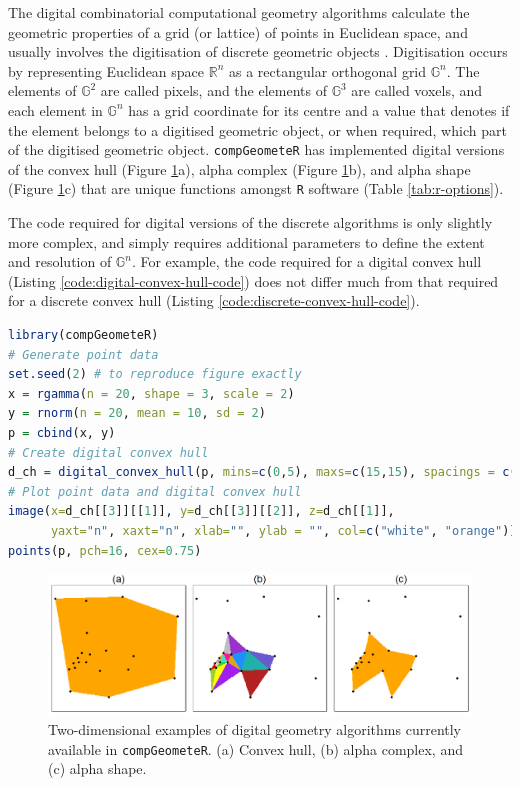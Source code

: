 \documentclass[12pt, a4paper]{article}
\begin{document}
The digital combinatorial computational geometry algorithms calculate the geometric properties of a grid (or lattice) of points in Euclidean space, and usually involves the digitisation of discrete geometric objects \citep{rosenfeld-1989}.  Digitisation occurs by representing Euclidean space $\mathbb{R}^n$ as a rectangular orthogonal grid $\mathbb{G}^n$.  The elements of $\mathbb{G}^2$ are called pixels, and the elements of $\mathbb{G}^3$ are called voxels, and each element in $\mathbb{G}^n$ has a grid coordinate for its centre \citep{klette-2004} and a value that denotes if the element belongs to a digitised geometric object, or when required, which part of the digitised geometric object.  \texttt{compGeometeR} has implemented digital versions of the convex hull (Figure \ref{fig:digital-algorithms}a), alpha complex (Figure \ref{fig:digital-algorithms}b), and alpha shape (Figure \ref{fig:digital-algorithms}c) that are unique functions amongst \texttt{R} software (Table \ref{tab:r-options}).

The code required for digital versions of the discrete algorithms is only slightly more complex, and simply requires additional parameters to define the extent and resolution of $\mathbb{G}^n$.  For example, the code required for a digital convex hull (Listing \ref{code:digital-convex-hull-code}) does not differ much from that required for a discrete convex hull (Listing \ref{code:discrete-convex-hull-code}).

\begin{lstlisting}[language=R, caption=Example \texttt{R} code to create a digital convex hull with \texttt{compGeometeR}, label={code:digital-convex-hull-code}]
library(compGeometeR)
# Generate point data
set.seed(2) # to reproduce figure exactly
x = rgamma(n = 20, shape = 3, scale = 2)
y = rnorm(n = 20, mean = 10, sd = 2)
p = cbind(x, y)
# Create digital convex hull
d_ch = digital_convex_hull(p, mins=c(0,5), maxs=c(15,15), spacings = c(0.05,0.05))
# Plot point data and digital convex hull
image(x=d_ch[[3]][[1]], y=d_ch[[3]][[2]], z=d_ch[[1]], 
      yaxt="n", xaxt="n", xlab="", ylab = "", col=c("white", "orange"))
points(p, pch=16, cex=0.75)
\end{lstlisting}

\begin{figure}[ht]
\centering
\includegraphics{figures/digital-algorithms/digital-algorithms.png}
\caption{Two-dimensional examples of digital geometry algorithms currently available in \texttt{compGeometeR}. (a) Convex hull, (b) alpha complex, and (c) alpha shape.}
\label{fig:digital-algorithms}
\end{figure}
\end{document}
